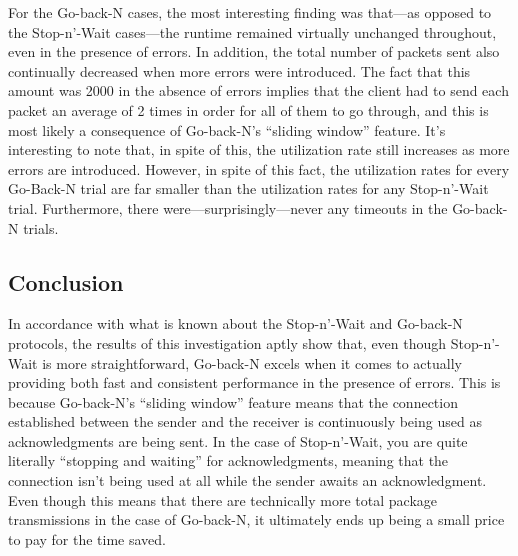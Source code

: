 \documentclass{article}
\begin{document}
For the Go-back-N cases, the most interesting finding was that—as opposed to the Stop-n'-Wait cases—the runtime remained virtually unchanged throughout, even in the presence of errors. In addition, the total number of packets sent also continually decreased when more errors were introduced. The fact that this amount was 2000 in the absence of errors implies that the client had to send each packet an average of 2 times in order for all of them to go through, and this is most likely a consequence of Go-back-N's ``sliding window'' feature. It's interesting to note that, in spite of this, the utilization rate still increases as more errors are introduced. However, in spite of this fact, the utilization rates for every Go-Back-N trial are far smaller than the utilization rates for any Stop-n'-Wait trial. Furthermore, there were—surprisingly—never any timeouts in the Go-back-N trials.

\subsection{Conclusion}

In accordance with what is known about the Stop-n'-Wait and Go-back-N protocols, the results of this investigation aptly show that, even though Stop-n'-Wait is more straightforward, Go-back-N excels when it comes to actually providing both fast and consistent performance in the presence of errors. This is because Go-back-N's ``sliding window'' feature means that the connection established between the sender and the receiver is continuously being used as acknowledgments are being sent. In the case of Stop-n'-Wait, you are quite literally ``stopping and waiting'' for acknowledgments, meaning that the connection isn't being used at all while the sender awaits an acknowledgment. Even though this means that there are technically more total package transmissions in the case of Go-back-N, it ultimately ends up being a small price to pay for the time saved.
\end{document}
